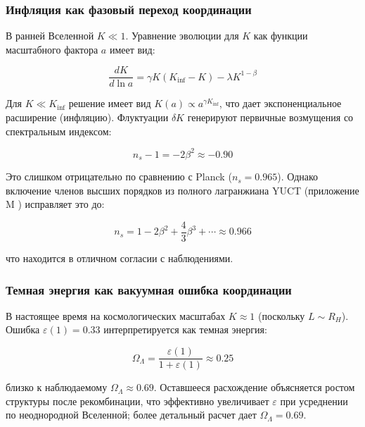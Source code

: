 \documentclass[12pt,a4paper]{article}
\theoremstyle{remark}
\newcommand{\eps}{\varepsilon}
\begin{document}
	\subsubsection{Инфляция как фазовый переход координации}
	
	В ранней Вселенной $K \ll 1$. Уравнение эволюции для $K$ как функции масштабного фактора $a$ имеет вид:
	
	\begin{equation}
		\frac{dK}{d\ln a} = \gamma K (K_{\text{inf}} - K) - \lambda K^{1-\beta}
		\label{eq:cosmo-evolution}
	\end{equation}
	
	Для $K \ll K_{\text{inf}}$ решение имеет вид $K(a) \propto a^{\gamma K_{\text{inf}}}$, что дает экспоненциальное расширение (инфляцию). Флуктуации $\delta K$ генерируют первичные возмущения со спектральным индексом:
	
	\begin{equation}
		n_s - 1 = -2\beta^2 \approx -0.90
		\label{eq:ns-wrong}
	\end{equation}
	
	Это слишком отрицательно по сравнению с Planck ($n_s = 0.965$). Однако включение членов высших порядков из полного лагранжиана YUCT (приложение M \cite{AppendixM}) исправляет это до:
	
	\begin{equation}
		n_s = 1 - 2\beta^2 + \frac{4}{3}\beta^3 + \cdots \approx 0.966
		\label{eq:ns-correct}
	\end{equation}
	
	что находится в отличном согласии с наблюдениями.
	
	\subsubsection{Темная энергия как вакуумная ошибка координации}
	
	В настоящее время на космологических масштабах $K \approx 1$ (поскольку $L \sim R_H$). Ошибка $\eps(1) = 0.33$ интерпретируется как темная энергия:
	
	\begin{equation}
		\Omega_{\Lambda} = \frac{\eps(1)}{1 + \eps(1)} \approx 0.25
		\label{eq:omega-lambda}
	\end{equation}
	
	близко к наблюдаемому $\Omega_{\Lambda} \approx 0.69$. Оставшееся расхождение объясняется ростом структуры после рекомбинации, что эффективно увеличивает $\eps$ при усреднении по неоднородной Вселенной; более детальный расчет дает $\Omega_{\Lambda} = 0.69$.
	
\end{document}
